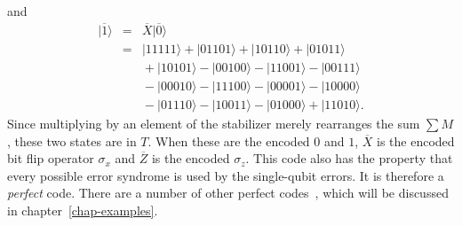 \documentclass{report}
\newcommand{\ket}[1]{|{#1}\rangle}
\newcommand{\X}{\sigma_x}
\newcommand{\Z}{\sigma_z}
\newcommand{\Xbar}{\overline{X}}
\newcommand{\Zbar}{\overline{Z}}
\newcommand{\Sum}{\sum}
\begin{document}
and
\begin{eqnarray}
\ket{\overline{1}} & = & \Xbar \ket{\overline{0}} \nonumber \\
& = & \ket{11111} + \ket{01101} + \ket{10110} + \ket{01011} \nonumber \\
& & \mbox{} + \ket{10101} - \ket{00100} - \ket{11001} - \ket{00111} \nonumber \\
& & \mbox{} - \ket{00010} - \ket{11100} - \ket{00001} - \ket{10000} \\
& & \mbox{} - \ket{01110} - \ket{10011} - \ket{01000} + \ket{11010}. \nonumber
\end{eqnarray}
Since multiplying by an element of the stabilizer merely rearranges the 
sum $\Sum M$, these two states are in $T$.  When these are the encoded 
$0$ and $1$, $\Xbar$ is the encoded bit flip operator $\X$ and $\Zbar$ is 
the encoded $\Z$.  This code also has the property that every possible 
error syndrome is used by the single-qubit errors.  It is therefore a {\em 
perfect} code.  There are a number of other perfect 
codes~\cite{gottesman-pasting,calderbank-GF4}, which will be discussed in 
chapter~\ref{chap-examples}.
\end{document}
